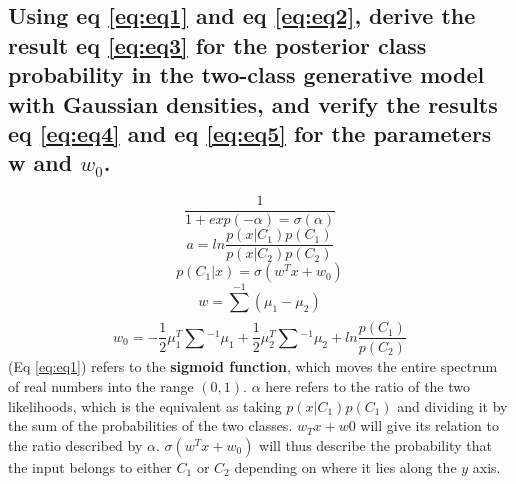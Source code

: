 \documentclass{article}
\begin{document}
	\subsection{Using eq \ref{eq:eq1} and eq \ref{eq:eq2}, derive the result eq \ref{eq:eq3} for the posterior class
		probability in the two-class generative model with Gaussian densities, and verify the
		results eq \ref{eq:eq4} and eq \ref{eq:eq5} for the parameters w and $w_{0}$.}
		\begin{equation}
			\label{eq:eq1}
			\frac{1}{1 + exp(-\alpha) = \sigma(\alpha)}
		\end{equation}
		\begin{equation}
			\label{eq:eq2}
			a = ln\frac{p(x|C_{1})p(C_{1})}{p(x|C_{2})p(C_{2})}	
		\end{equation}
		\begin{equation}
			\label{eq:eq3}
			p(C_{1}|x) = \sigma(w^{T}x + w_{0})
		\end{equation}
		\begin{equation}
			\label{eq:eq4}
			w = \sum_{}^{-1}(\mu_{1} - \mu_{2})
		\end{equation}
		\begin{equation}
			\label{eq:eq5}
				w_{0} = -\frac{1}{2}\mu^{T}_{1}\sum_{}^{}^{-1}\mu_{1} + \frac{1}{2}\mu_{2}^{T}\sum_{}^{}^{-1}\mu_{2} + ln\frac{p(C_{1})}{p(C_{2})}
		\end{equation}
		(Eq \ref{eq:eq1}) refers to the \textbf{sigmoid function}, which moves the entire spectrum of real 
		numbers into the range $(0,1)$. $\alpha$ here refers to the ratio of the two likelihoods, which is the 
		equivalent as taking $p(x|C_{1})p(C_{1})$ and dividing it by the sum of the probabilities of the two
		classes. $w_{T}x + w{0}$ will give its relation to the ratio described by $\alpha$. 
		$\sigma(w^{T}x + w_{0})$ will thus describe the probability that the input belongs to either $C_{1}$ or 
		$C_{2}$ depending on where it lies along the $y$ axis. 
\end{document}
